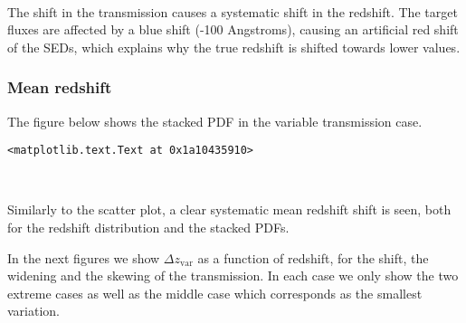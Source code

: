 \documentclass{article}
\begin{document}
    \begin{center}
    \end{center}
    { \hspace*{\fill} \\}
    
    The shift in the transmission causes a systematic shift in the redshift.
The target fluxes are affected by a blue shift (-100 Angstroms), causing
an artificial red shift of the SEDs, which explains why the true
redshift is shifted towards lower values.

\hypertarget{mean-redshift}{%
\subsubsection{Mean redshift}\label{mean-redshift}}

The figure below shows the stacked PDF in the variable transmission
case.


    

    
    
    \begin{verbatim}
<matplotlib.text.Text at 0x1a10435910>
    \end{verbatim}

    

    \begin{center}
    \end{center}
    { \hspace*{\fill} \\}
    
    Similarly to the scatter plot, a clear systematic mean redshift shift is
seen, both for the redshift distribution and the stacked PDFs.

In the next figures we show \(\Delta z_\mathrm{var}\) as a function of
redshift, for the shift, the widening and the skewing of the
transmission. In each case we only show the two extreme cases as well as
the middle case which corresponds as the smallest variation.



    \begin{center}
    \end{center}
    { \hspace*{\fill} \\}
    
\end{document}
